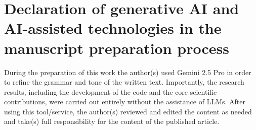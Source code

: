 \documentclass[preprint,1p,12pt,authoryear]{elsarticle} %
\begin{document}
%  


\newpage


\section*{Declaration of generative AI and AI-assisted technologies in the manuscript preparation process}
During the preparation of this work the author(s) used Gemini 2.5 Pro in order to refine the grammar and tone of the written text. Importantly, the research results, including the development of the code and the core scientific contributions, were carried out entirely without the assistance of LLMs. After using this tool/service, the author(s) reviewed and edited the content as needed and take(s) full responsibility for the content of the published article.
\end{document}
